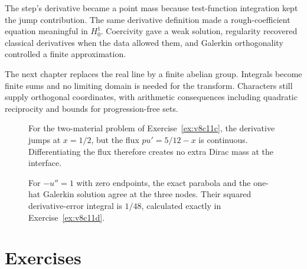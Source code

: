 The step's derivative became a point mass because test-function integration kept the jump contribution. The same derivative definition made a rough-coefficient equation meaningful in $H^1_0$. Coercivity gave a weak solution, regularity recovered classical derivatives when the data allowed them, and Galerkin orthogonality controlled a finite approximation.

The next chapter replaces the real line by a finite abelian group. Integrals become finite sums and no limiting domain is needed for the transform. Characters still supply orthogonal coordinates, with arithmetic consequences including quadratic reciprocity and bounds for progression-free sets.

\begin{figure}[ht]
\centering{}
\caption{For the two-material problem of Exercise~\ref{ex:v8c11c}, the derivative jumps at $x=1/2$, but the flux $pu'=5/12-x$ is continuous. Differentiating the flux therefore creates no extra Dirac mass at the interface.}
\label{fig:v8c11flux}
\end{figure}
\begin{figure}[ht]
\centering{}
\caption{For $-u''=1$ with zero endpoints, the exact parabola and the one-hat Galerkin solution agree at the three nodes. Their squared derivative-error integral is $1/48$, calculated exactly in Exercise~\ref{ex:v8c11d}.}
\label{fig:v8c11galerkin}
\end{figure}

\section{Exercises}

